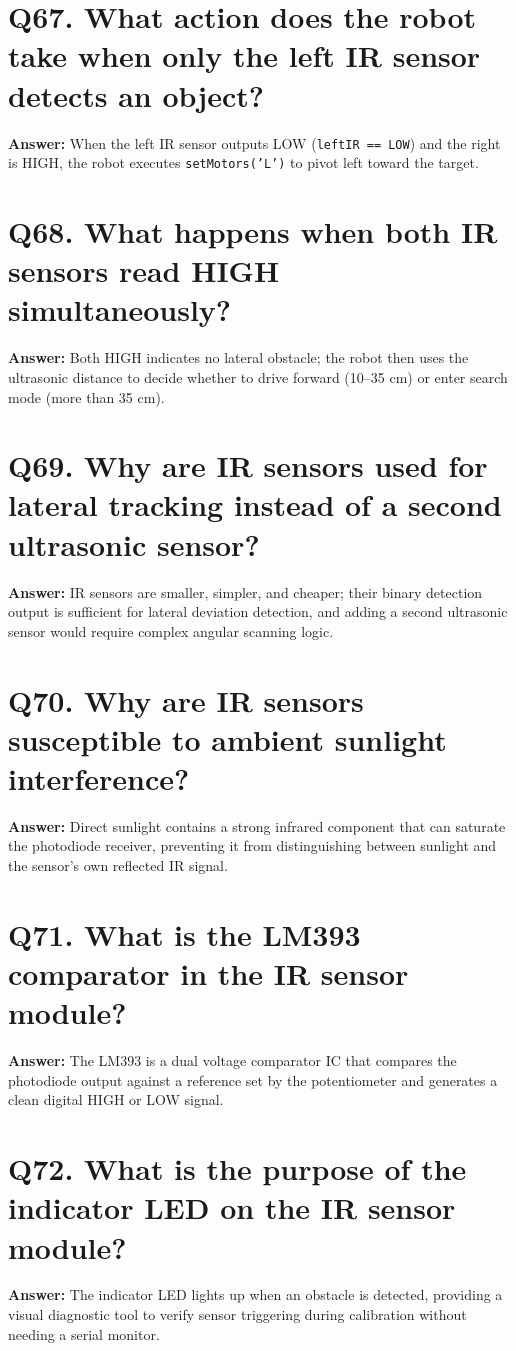\documentclass[12pt,a4paper,oneside]{report}
\begin{document}
\section{Q67. What action does the robot take when only the left IR sensor detects an object?}
\textbf{Answer:} When the left IR sensor outputs LOW (\texttt{leftIR == LOW}) and the right is HIGH, the robot executes \texttt{setMotors('L')} to pivot left toward the target.

\section{Q68. What happens when both IR sensors read HIGH simultaneously?}
\textbf{Answer:} Both HIGH indicates no lateral obstacle; the robot then uses the ultrasonic distance to decide whether to drive forward (10--35 cm) or enter search mode (more than 35 cm).

\section{Q69. Why are IR sensors used for lateral tracking instead of a second ultrasonic sensor?}
\textbf{Answer:} IR sensors are smaller, simpler, and cheaper; their binary detection output is sufficient for lateral deviation detection, and adding a second ultrasonic sensor would require complex angular scanning logic.

\section{Q70. Why are IR sensors susceptible to ambient sunlight interference?}
\textbf{Answer:} Direct sunlight contains a strong infrared component that can saturate the photodiode receiver, preventing it from distinguishing between sunlight and the sensor's own reflected IR signal.

\section{Q71. What is the LM393 comparator in the IR sensor module?}
\textbf{Answer:} The LM393 is a dual voltage comparator IC that compares the photodiode output against a reference set by the potentiometer and generates a clean digital HIGH or LOW signal.

\section{Q72. What is the purpose of the indicator LED on the IR sensor module?}
\textbf{Answer:} The indicator LED lights up when an obstacle is detected, providing a visual diagnostic tool to verify sensor triggering during calibration without needing a serial monitor.
\end{document}

